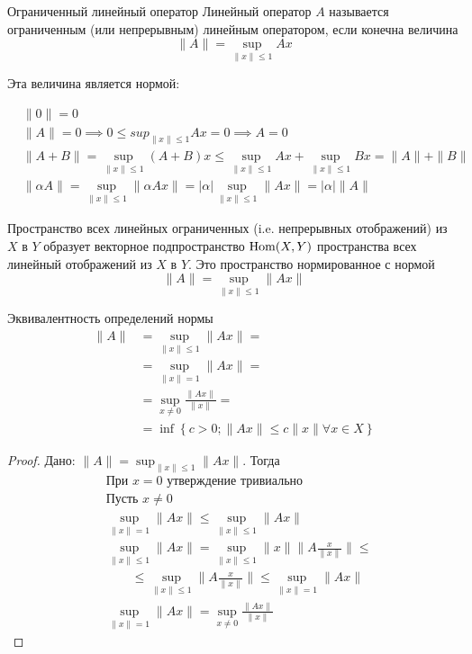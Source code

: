 \begin{dfn}{Ограниченный линейный оператор}
  Линейный оператор $A$
  называется ограниченным (или непрерывным) линейным оператором,
  если конечна величина
  $$\|A\| = \sup_{\|x\|\leq 1} A x$$

  Эта величина является нормой:

  \begin{align*}
    & \|0\| = 0 \\
    & \|A\| = 0 \implies 0\leq sup_{\|x\|\leq 1} A x = 0 \implies A = 0 \\
    & \|A + B\| = \sup_{\|x\|\leq 1} (A + B) x \leq \sup_{\|x\|\leq 1} A x + \sup_{\|x\|\leq 1} B x = \|A\| + \|B\| \\
    & \|\alpha A\| = \sup_{\|x\|\leq 1} \|\alpha A x\| = \left|\alpha\right| \sup_{\|x\|\leq 1} \|A x\| = \left|\alpha\right| \|A\|
  \end{align*}
\end{dfn}

Пространство всех линейных ограниченных (i.e. непрерывных отображений) из $X$ в $Y$
образует векторное подпространство $\mathrm{Hom}(X, Y)$
пространства всех линейный отображений из $X$ в $Y$.
Это пространство нормированное с нормой
$$\|A\| = \sup_{\|x\|\leq 1} \|A x\|$$

\begin{thm}{Эквивалентность определений нормы}
  \begin{align*}
    \|A\| &= \sup_{\|x\|\leq 1} \|A x\| = \\
          &= \sup_{\|x\|=1} \|A x\| = \\
          &= \sup_{x\neq 0} \frac{\|A x\|}{\|x\|} = \\
          &= \inf\left\{c>0; \|A x\| \leq c\|x\| \forall x\in X \right\}
  \end{align*}
\end{thm}
\begin{proof}
  Дано: $\|A\| = \sup_{\|x\|\leq 1} \|A x\|$.
  Тогда
  \begin{align*}
    &\text{При } x=0 \text{ утверждение тривиально }\\
    &\text{Пусть } x\neq 0\\
    &\sup_{\|x\|=1} \|A x\| \leq \sup_{\|x\|\leq 1} \|A x\| \\
    &\sup_{\|x\|\leq 1} \|A x\| = \sup_{\|x\|\leq 1} \|x\| \|A \frac{x}{\|x\|}\| \leq\\
    &\qquad \leq \sup_{\|x\|\leq 1} \|A \frac{x}{\|x\|}\| \leq \sup_{\|x\|=1} \|A x\| \\
    &\sup_{\|x\|=1} \|A x\| = \sup_{x\neq 0} \frac{\|A x\|}{\|x\|}
  \end{align*}
\end{proof}

